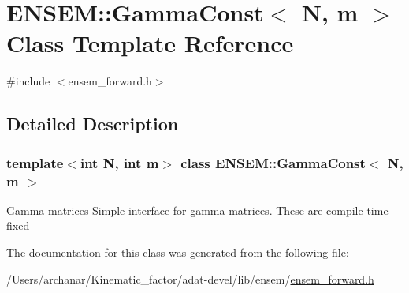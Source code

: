 \hypertarget{classENSEM_1_1GammaConst}{}\section{E\+N\+S\+EM\+:\+:Gamma\+Const$<$ N, m $>$ Class Template Reference}
\label{classENSEM_1_1GammaConst}


{\ttfamily \#include $<$ensem\+\_\+forward.\+h$>$}



\subsection{Detailed Description}
\subsubsection*{template$<$int N, int m$>$\newline
class E\+N\+S\+E\+M\+::\+Gamma\+Const$<$ N, m $>$}

Gamma matrices Simple interface for gamma matrices. These are compile-\/time fixed 

The documentation for this class was generated from the following file\+:\begin{DoxyCompactItemize}
\item 
/\+Users/archanar/\+Kinematic\+\_\+factor/adat-\/devel/lib/ensem/\mbox{\hyperlink{adat-devel_2lib_2ensem_2ensem__forward_8h}{ensem\+\_\+forward.\+h}}\end{DoxyCompactItemize}
